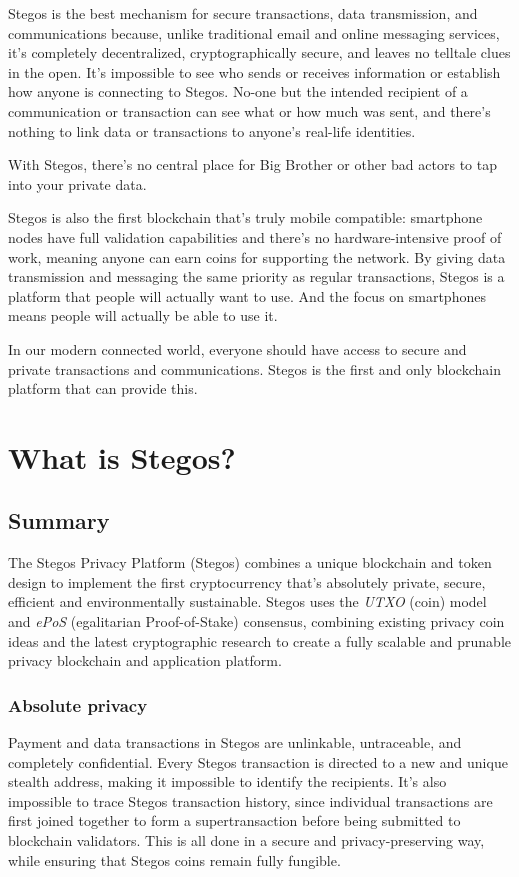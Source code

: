 \documentclass[8pt,fleqn,openany]{book}
\begin{document}
Stegos is the best mechanism for secure transactions, data transmission, and communications because, unlike traditional email and online messaging services, it’s completely decentralized, cryptographically secure, and leaves no telltale clues in the open. It’s impossible to see who sends or receives information or establish how anyone is connecting to Stegos. No-one but the intended recipient of a communication or transaction can see what or how much was sent, and there’s nothing to link data or transactions to anyone’s real-life identities.

With Stegos, there's no central place for Big Brother or other bad actors to tap into your private data.

Stegos is also the first blockchain that's truly mobile compatible: smartphone nodes have full validation capabilities and there's no hardware-intensive proof of work, meaning anyone can earn coins for supporting the network. By giving data transmission and messaging the same priority as regular transactions, Stegos is a platform that people will actually want to use. And the focus on smartphones means people will actually be able to use it.

In our modern connected world, everyone should have access to secure and private transactions and communications. Stegos is the first and only blockchain platform that can provide this.  
	
\chapter{What is Stegos?}\label{chap:what-is-stegos}

\section{Summary}
The Stegos Privacy Platform (Stegos) combines a unique blockchain and token design to implement the first cryptocurrency that’s absolutely private, secure, efficient and environmentally sustainable. Stegos uses the \textit{UTXO} (coin) model and \textit{ePoS} (egalitarian Proof-of-Stake) consensus, combining existing privacy coin ideas and the latest cryptographic research to create a fully scalable and prunable privacy blockchain and application platform. 
 
\subsection{Absolute privacy}
Payment and data transactions in Stegos are unlinkable, untraceable, and completely confidential. Every Stegos transaction is directed to a new and unique stealth address, making it impossible to identify the recipients. It’s also impossible to trace Stegos transaction history, since individual transactions are first joined together to form a supertransaction before being submitted to blockchain validators. This is all done in a secure and privacy-preserving way, while ensuring that Stegos coins remain fully fungible.
\end{document}
